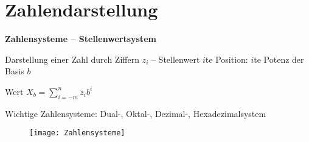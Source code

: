 \section{Zahlendarstellung}
\label{sec:zahlendarstellung}

\textbf{Zahlensysteme -- Stellenwertsystem}
\begin{items}
	\item Darstellung einer Zahl durch Ziffern $z_i$ -- Stellenwert $i$te Position: $i$te Potenz der Basis $b$
	\item Wert $X_b = \sum _{i=-m}^n z_ib^i$
	\item Wichtige Zahlensysteme: Dual-, Oktal-, Dezimal-, Hexadezimalsystem
\end{items}
\begin{figure}[ht]
  \centering
  \texttt{[image: Zahlensysteme]}
  \label{Zahlensysteme}
\end{figure}

